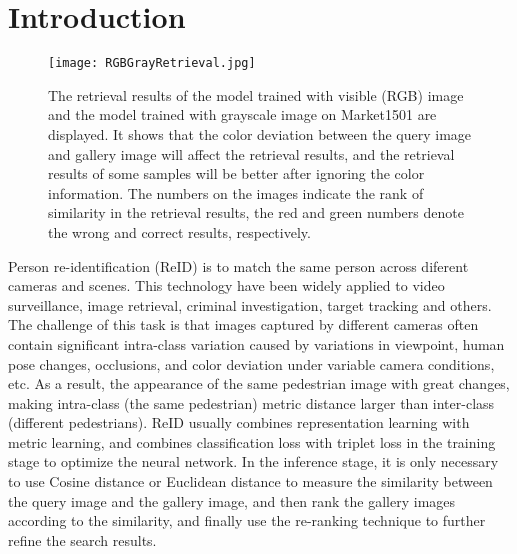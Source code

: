 \documentclass[10pt,twocolumn,letterpaper]{article}
\begin{document}
\section{Introduction}
\label{sec:intro}

\begin{figure}[]
\centering
\texttt{[image: RGBGrayRetrieval.jpg]}
	\caption{The retrieval results of the model trained with visible (RGB) image and the model trained with grayscale image on Market1501\cite{market1501} are displayed. It shows that the color deviation between the query image and gallery image will affect the retrieval results, and the retrieval results of some samples will be better after ignoring the color information. The numbers on the images indicate the rank of similarity in the retrieval results, the red and green numbers denote the wrong and correct results, respectively.}
	\label{fig:onecol}
\end{figure}
Person re-identification (ReID) is to match the same person across diferent cameras and scenes\cite{survey,market1501,baseline,Li_2021_CVPR}. This technology have been widely applied to video surveillance\cite{Hou_2021_CVPR,Tian_2021_CVPR,Liu_2021_CVPR}, image retrieval\cite{sketch-criminal,sketch-based}, criminal investigation\cite{sketch-criminal}, target tracking\cite{Beyer_2017_CVPR_Workshops} and others. The challenge of this task is that images captured by different cameras often contain significant intra-class variation caused by variations in viewpoint, human pose changes, occlusions, and color deviation under variable camera conditions, etc. As a result, the appearance of the same pedestrian image with great changes, making intra-class (the same pedestrian) metric distance larger than inter-class (different pedestrians). ReID usually combines representation learning\cite{zheng2017discriminatively,matsukawa2016person,fan2019spherereid,lin2019improving,zheng2016person,yao2019deep} with metric learning\cite{wang2019ranked,varior2016gated,varior2016siamese,schroff2015facenet,liu2017end,cheng2016person,hermans2017defense}, and combines classification loss\cite{yao2019deep,fan2019spherereid,zheng2017discriminatively} with triplet loss\cite{hermans2017defense,cheng2016person} in the training stage to optimize the neural network. In the inference stage, it is only necessary to use Cosine distance or Euclidean distance to measure the similarity between the query image and the gallery image, and then rank the gallery images according to the similarity, and finally use the re-ranking technique\cite{re_ranking} to further refine the search results.
\end{document}
